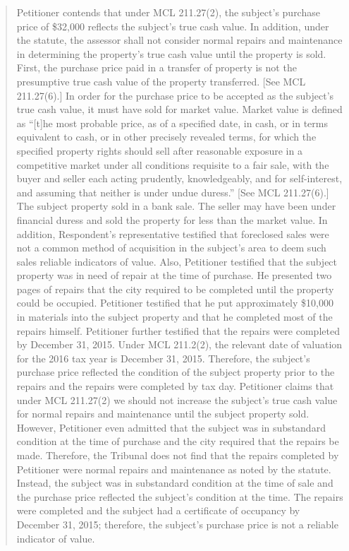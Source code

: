 \documentclass[12pt,\documentclassflag]{michiganCourtOfAppealsBrief}
\begin{document}
\begin{quote} Petitioner contends that under MCL 211.27(2), the subject's purchase price of \$32,000 reflects the subject's true cash value. In addition, under the statute, the assessor shall not consider normal repairs and maintenance in determining the property's true cash value until the property is sold. First, the purchase price paid in a transfer of property is not the presumptive true cash value of the property transferred. [See MCL 211.27(6).] In order for the purchase price to be accepted as the subject's true cash value, it must have sold for market value. Market value is defined as ``[t]he most probable price, as of a specified date, in cash, or in terms equivalent to cash, or in other precisely revealed terms, for which the specified property rights should sell after reasonable exposure in a competitive market under all conditions requisite to a fair sale, with the buyer and seller each acting prudently, knowledgeably, and for self-interest, and assuming that neither is under undue duress.'' [See MCL 211.27(6).] The subject property sold in a bank sale. The seller may have been under financial duress and sold the property for less than the market value. In addition, Respondent's representative testified that foreclosed sales were not a common method of acquisition in the subject's area to deem such sales reliable indicators of value. Also, Petitioner testified that the subject property was in need of repair at the time of purchase. He presented two pages of repairs that the city required to be completed until the property could be occupied. Petitioner testified that he put approximately \$10,000 in materials into the subject property and that he completed most of the repairs himself. Petitioner further testified that the repairs were completed by December 31, 2015. Under MCL 211.2(2), the relevant date of valuation for the 2016 tax year is December 31, 2015. Therefore, the subject's purchase price reflected the condition of the subject property prior to the repairs and the repairs were completed by tax day. Petitioner claims that under MCL 211.27(2) we should not increase the subject's true cash value for normal repairs and maintenance until the subject property sold. However, Petitioner even admitted that the subject was in substandard condition at the time of purchase and the city required that the repairs be made. Therefore, the Tribunal does not find that the repairs completed by Petitioner were normal repairs and maintenance as noted by the statute. Instead, the subject was in substandard condition at the time of sale and the purchase price reflected the subject's condition at the time. The repairs were completed and the subject had a certificate of occupancy by December 31, 2015; therefore, the subject's purchase price is not a reliable indicator of value. 
\end{quote}
\end{document}
